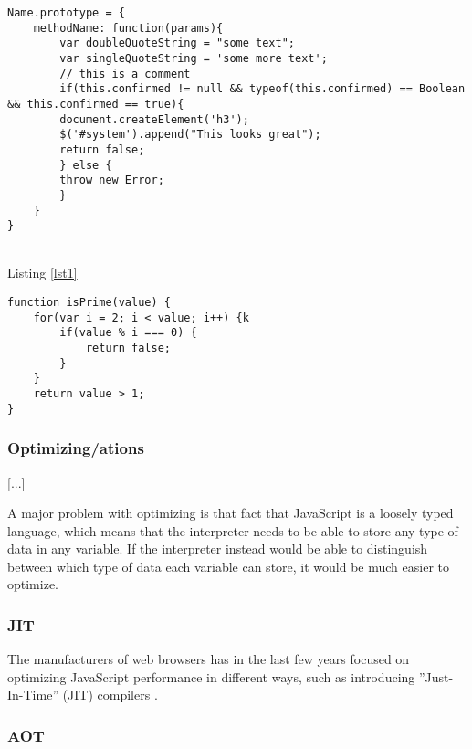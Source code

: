 \clearpage

\begin{lstlisting}[label=lst1,language=JavaScript2,numbers=none,caption=Listing 1,frame=shadowbox]
Name.prototype = {
    methodName: function(params){
        var doubleQuoteString = "some text";
        var singleQuoteString = 'some more text';
        // this is a comment
        if(this.confirmed != null && typeof(this.confirmed) == Boolean && this.confirmed == true){
        document.createElement('h3');
        $('#system').append("This looks great");
        return false;
        } else {
        throw new Error;
        }
    }
}
\end{lstlisting}

\blindtext\\
Listing \ref{lst1}

\begin{lstlisting}[language=JavaScript2,numbers=none,caption=Listing 2,frame=shadowbox]
function isPrime(value) {
    for(var i = 2; i < value; i++) {k
        if(value % i === 0) {
            return false;
        }
    }
    return value > 1;
}
\end{lstlisting}

\blindtext

\subsubsection{Optimizing/ations}

[...]

A major problem with optimizing is that fact that JavaScript is a loosely typed language, which means that the interpreter needs to be able to store any type of data in any variable. If the interpreter instead would be able to distinguish between which type of data each variable can store, it would be much easier to optimize.

\subsubsection{JIT}

The manufacturers of web browsers has in the last few years focused on optimizing JavaScript performance in different ways, such as introducing ''Just-In-Time'' (JIT) compilers \parencite{HerreraChenLavoieHendren2018}.

\subsubsection{AOT}




